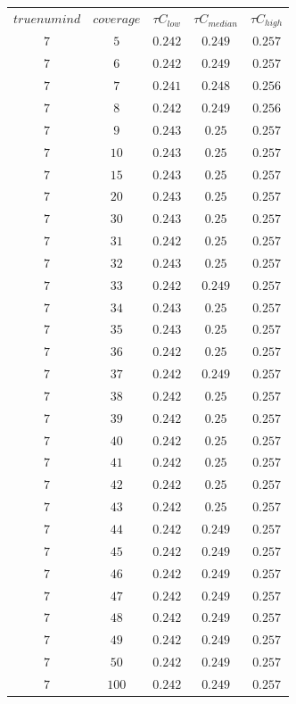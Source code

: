 \begin{table}[H]
\begin{tabular}{ccccc}
$truenumind$ & $coverage$ & ${\tau}C_{low}$ & ${\tau}C_{median}$ & ${\tau}C_{high}$\\
$7$ & $5$ & $0.242$ & $0.249$ & $0.257$\\
$7$ & $6$ & $0.242$ & $0.249$ & $0.257$\\
$7$ & $7$ & $0.241$ & $0.248$ & $0.256$\\
$7$ & $8$ & $0.242$ & $0.249$ & $0.256$\\
$7$ & $9$ & $0.243$ & $0.25$ & $0.257$\\
$7$ & $10$ & $0.243$ & $0.25$ & $0.257$\\
$7$ & $15$ & $0.243$ & $0.25$ & $0.257$\\
$7$ & $20$ & $0.243$ & $0.25$ & $0.257$\\
$7$ & $30$ & $0.243$ & $0.25$ & $0.257$\\
$7$ & $31$ & $0.242$ & $0.25$ & $0.257$\\
$7$ & $32$ & $0.243$ & $0.25$ & $0.257$\\
$7$ & $33$ & $0.242$ & $0.249$ & $0.257$\\
$7$ & $34$ & $0.243$ & $0.25$ & $0.257$\\
$7$ & $35$ & $0.243$ & $0.25$ & $0.257$\\
$7$ & $36$ & $0.242$ & $0.25$ & $0.257$\\
$7$ & $37$ & $0.242$ & $0.249$ & $0.257$\\
$7$ & $38$ & $0.242$ & $0.25$ & $0.257$\\
$7$ & $39$ & $0.242$ & $0.25$ & $0.257$\\
$7$ & $40$ & $0.242$ & $0.25$ & $0.257$\\
$7$ & $41$ & $0.242$ & $0.25$ & $0.257$\\
$7$ & $42$ & $0.242$ & $0.25$ & $0.257$\\
$7$ & $43$ & $0.242$ & $0.25$ & $0.257$\\
$7$ & $44$ & $0.242$ & $0.249$ & $0.257$\\
$7$ & $45$ & $0.242$ & $0.249$ & $0.257$\\
$7$ & $46$ & $0.242$ & $0.249$ & $0.257$\\
$7$ & $47$ & $0.242$ & $0.249$ & $0.257$\\
$7$ & $48$ & $0.242$ & $0.249$ & $0.257$\\
$7$ & $49$ & $0.242$ & $0.249$ & $0.257$\\
$7$ & $50$ & $0.242$ & $0.249$ & $0.257$\\
$7$ & $100$ & $0.242$ & $0.249$ & $0.257$\\
\end{tabular}
\end{table}
 